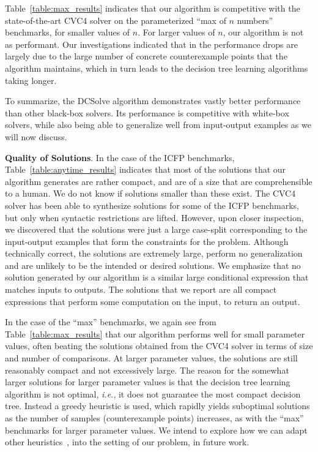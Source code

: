 \documentclass{llncs}
\newcommand{\ie}{\emph{i.e.}}
\newcommand{\dcsolve}{{\sffamily\fontsize{8.5}{10}\selectfont
    DCSolve}\xspace}
\renewcommand{\paragraph}[1]{\par\noindent\textbf{#1}.}
\begin{document}
Table~\ref{table:max_results} indicates that our algorithm is competitive
with the state-of-the-art CVC4 solver on the parameterized ``max of
$n$ numbers'' benchmarks, for smaller values of $n$. For larger
values of $n$, our algorithm is not as performant. Our investigations
indicated that in the performance drops are largely due to the large
number of concrete counterexample points that the algorithm maintains,
which in turn leads to the decision tree learning algorithms taking
longer.

To summarize, the \dcsolve algorithm demonstrates vastly better
performance than other black-box solvers. Its performance is
competitive with white-box solvers, while also being able to
generalize well from input-output examples as we will now discuss.

\paragraph{Quality of Solutions}
In the case of the ICFP benchmarks, Table~\ref{table:anytime_results}
indicates that most of the solutions that our algorithm generates are
rather compact, and are of a size that are comprehensible to a
human. We do not know if solutions smaller than these exist. The CVC4
solver has been able to synthesize solutions for some of the ICFP
benchmarks, but only when syntactic restrictions are lifted. However,
upon closer inspection, we discovered that the solutions were just a
large case-split corresponding to the input-output examples that form
the constraints for the problem. Although technically correct, the
solutions are extremely large, perform no generalization and are
unlikely to be the intended or desired solutions. We emphasize
that no solution generated by our algorithm is a similar large
conditional expression that matches inputs to outputs. The solutions
that we report are all compact expressions that perform some
computation on the input, to return an output.

In the case of the ``max'' benchmarks, we again see from
Table~\ref{table:max_results} that our algorithm performs well for
small parameter values, often beating the solutions obtained from the
CVC4 solver in terms of size and number of comparisons. At larger
parameter values, the solutions are still reasonably compact and not
excessively large. The reason for the somewhat larger solutions for
larger parameter values is that the decision tree learning algorithm
is not optimal, \ie, it does not guarantee the most compact decision
tree. Instead a greedy heuristic is used, which rapidly yields
suboptimal solutions as the number of samples (counterexample points)
increases, as with the ``max'' benchmarks for larger
parameter values. We intend to explore how we can adapt other
heuristics~\cite{madhusudan-16-pw}, into the setting of our problem, in future
work.
\end{document}
